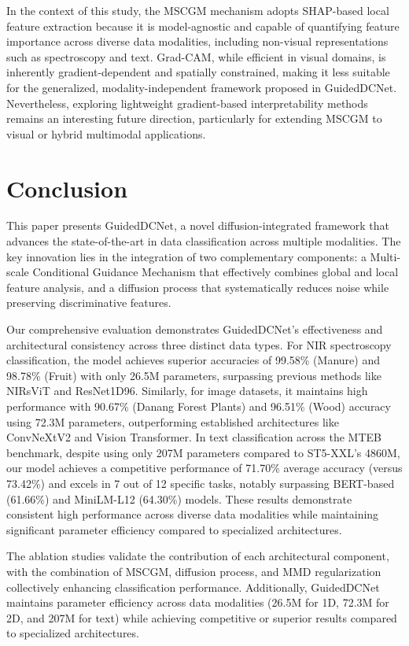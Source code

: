 \documentclass[a4paper,fleqn]{cas-sc}
\begin{document}
In the context of this study, the MSCGM mechanism adopts SHAP-based local feature extraction because it is model-agnostic and capable of quantifying feature importance across diverse data modalities, including non-visual representations such as spectroscopy and text. Grad-CAM, while efficient in visual domains, is inherently gradient-dependent and spatially constrained, making it less suitable for the generalized, modality-independent framework proposed in GuidedDCNet. Nevertheless, exploring lightweight gradient-based interpretability methods remains an interesting future direction, particularly for extending MSCGM to visual or hybrid multimodal applications.

\section{Conclusion}

This paper presents GuidedDCNet, a novel diffusion-integrated framework that advances the state-of-the-art in data classification across multiple modalities. The key innovation lies in the integration of two complementary components: a Multi-scale Conditional Guidance Mechanism that effectively combines global and local feature analysis, and a diffusion process that systematically reduces noise while preserving discriminative features.

Our comprehensive evaluation demonstrates GuidedDCNet's effectiveness and architectural consistency across three distinct data types. For NIR spectroscopy classification, the model achieves superior accuracies of 99.58\% (Manure) and 98.78\% (Fruit) with only 26.5M parameters, surpassing previous methods like NIRsViT and ResNet1D96. Similarly, for image datasets, it maintains high performance with 90.67\% (Danang Forest Plants) and 96.51\% (Wood) accuracy using 72.3M parameters, outperforming established architectures like ConvNeXtV2  and Vision Transformer. In text classification across the MTEB benchmark, despite using only 207M parameters compared to ST5-XXL's 4860M, our model achieves a competitive performance of 71.70\% average accuracy (versus 73.42\%) and excels in 7 out of 12 specific tasks, notably surpassing BERT-based (61.66\%) and MiniLM-L12 (64.30\%) models. These results demonstrate consistent high performance across diverse data modalities while maintaining significant parameter efficiency compared to specialized architectures.

The ablation studies validate the contribution of each architectural component, with the combination of MSCGM, diffusion process, and MMD regularization collectively enhancing classification performance. Additionally, GuidedDCNet maintains parameter efficiency across data modalities (26.5M for 1D, 72.3M for 2D, and 207M for text) while achieving competitive or superior results compared to specialized architectures.
\end{document}
